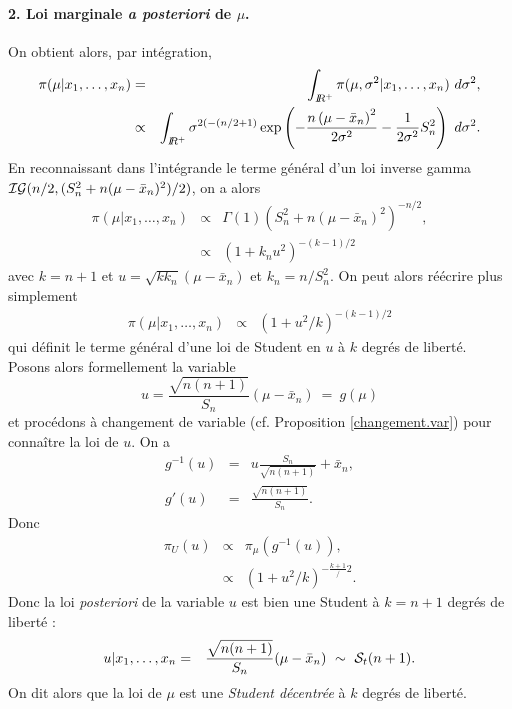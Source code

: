 \begin{rep}
\paragraph{2. Loi marginale {\it a posteriori} de $\mu$.}
On obtient alors,
par intégration,
\begin{eqnarray*}
\pi(\mu|x_1,\ldots,x_n) & = & \int_{I\!\!R^+} \pi(\mu,\sigma^2|x_1,\ldots,x_n) \ d\sigma^2, \\
& \propto & \int_{I\!\!R^+} \sigma^{2(-(n/2+1)} \exp \left( - \frac{n\left(\mu-\bar{x}_n\right)^2}{2\sigma^2} -\frac{1}{2\sigma^2} S_n^2
\right) \ d\sigma^2.
\end{eqnarray*}
En reconnaissant dans l'intégrande le terme général d'un loi inverse gamma ${\cal{IG}}(n/2,(S^2_n + n(\mu-\bar{x}_n)^2)/2)$, on a alors
\begin{eqnarray*}
\pi(\mu|x_1,\ldots,x_n) & \propto & \Gamma(1)\left(S^2_n + n(\mu-\bar{x}_n)^2\right)^{-n/2}, \\
& \propto & \left(1+k_n u^2\right)^{-(k-1)/2}
\end{eqnarray*}
avec $k=n+1$ et $u=\sqrt{k k_n}(\mu-\bar{x}_n)$ et $k_n=n/S^2_n$. On peut alors réécrire plus simplement
\begin{eqnarray*}
\pi(\mu|x_1,\ldots,x_n) & \propto & \left(1+u^2/k\right)^{-(k-1)/2}
\end{eqnarray*}
qui définit le terme général d'une loi de Student en $u$ à $k$ degrés de liberté. Posons alors formellement la variable 
$$
u = \frac{\sqrt{n(n+1)}}{S_n}(\mu-\bar{x}_n) \ = \ g(\mu)
$$
et procédons à changement de variable (cf. Proposition \ref{changement.var}) pour connaître la loi de $u$. On a 
\begin{eqnarray*}
g^{-1}(u) & = & u \frac{S_n}{\sqrt{n(n+1)}} + \bar{x}_n, \\
g'(u) & = &  \frac{\sqrt{n(n+1)}}{S_n}.
\end{eqnarray*}
Donc
\begin{eqnarray*}
\pi_U(u) & \propto & \pi_{\mu}(g^{-1}(u)), \\
& \propto & (1+u^2/k)^{-\frac{k+1}/2}.
\end{eqnarray*}
Donc la loi {\it posteriori} de la variable $u$ est bien une Student à $k=n+1$ degrés de liberté :
\begin{eqnarray*}
u|x_1,\ldots,x_n & = & \frac{\sqrt{n(n+1)}}{S_n}(\mu-\bar{x}_n) \ \sim \ {\cal{S}}_t(n+1).
\end{eqnarray*}
On dit alors que la loi de $\mu$ est une \emph{Student décentrée} à $k$ degrés de liberté. 


\end{rep}
